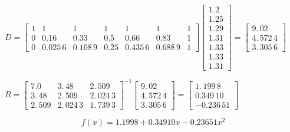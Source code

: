 \documentclass{article}
\begin{document}
$\allowbreak $

$D=\left[ 
\begin{array}{ccccccc}
1 & 1 & 1 & 1 & 1 & 1 & 1 \\ 
0 & 0.16 & 0.33 & 0.5 & 0.66 & 0.83 & 1 \\ 
0 & 0.025\,6 & 0.108\,9 & 0.25 & 0.435\,6 & 0.688\,9 & 1%
\end{array}%
\right] \left[ 
\begin{array}{c}
1.2 \\ 
1.25 \\ 
1.29 \\ 
1.31 \\ 
1.33 \\ 
1.33 \\ 
1.31%
\end{array}%
\right] =\allowbreak \left[ 
\begin{array}{c}
9.\,\allowbreak 02 \\ 
4.\,\allowbreak 572\,4 \\ 
3.\,\allowbreak 305\,6%
\end{array}%
\right] $

$R=\left[ 
\begin{array}{ccc}
7.0 & 3.\,\allowbreak 48 & 2.\,\allowbreak 509 \\ 
3.\,\allowbreak 48 & 2.\,\allowbreak 509 & 2.\,\allowbreak 024\,3 \\ 
2.\,\allowbreak 509 & 2.\,\allowbreak 024\,3 & 1.\,\allowbreak 739\,3%
\end{array}%
\right] ^{-1}\left[ 
\begin{array}{c}
9.\,\allowbreak 02 \\ 
4.\,\allowbreak 572\,4 \\ 
3.\,\allowbreak 305\,6%
\end{array}%
\right] =\allowbreak \left[ 
\begin{array}{c}
1.\,\allowbreak 199\,8 \\ 
0.349\,10 \\ 
-0.236\,51%
\end{array}%
\right] \allowbreak $

\bigskip

\bigskip

\[
f(x)=1.1998+0.34910x-0.23651x^{2}
\]
\end{document}
